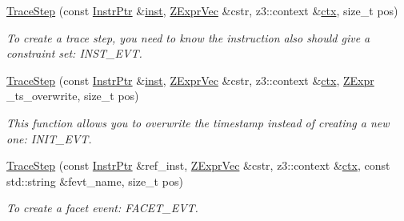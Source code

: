 \begin{DoxyCompactItemize}
\mbox{\hyperlink{classilang_1_1_trace_step_a66648351fc56eb04788815ee04621153}{Trace\+Step}} (const \mbox{\hyperlink{namespaceilang_af88a19312ae653d687a0d1207bb284f6}{Instr\+Ptr}} \&\mbox{\hyperlink{classilang_1_1_trace_step_ad46be2e7ab006f89051c91dd939ece7a}{inst}}, \mbox{\hyperlink{classilang_1_1_trace_step_a19a387426712dbec11dcecf170fb7e1a}{Z\+Expr\+Vec}} \&cstr, z3\+::context \&\mbox{\hyperlink{classilang_1_1_trace_step_afcab3e7a5ce7b619dd445882a9846c93}{ctx}}, size\+\_\+t pos)
\begin{DoxyCompactList}\small\item\em To create a trace step, you need to know the instruction also should give a constraint set\+: I\+N\+S\+T\+\_\+\+E\+VT. \end{DoxyCompactList}\item 
\mbox{\label{classilang_1_1_trace_step_a58487a85ca2aac2b322702bd1277d360}} 
\mbox{\hyperlink{classilang_1_1_trace_step_a58487a85ca2aac2b322702bd1277d360}{Trace\+Step}} (const \mbox{\hyperlink{namespaceilang_af88a19312ae653d687a0d1207bb284f6}{Instr\+Ptr}} \&\mbox{\hyperlink{classilang_1_1_trace_step_ad46be2e7ab006f89051c91dd939ece7a}{inst}}, \mbox{\hyperlink{classilang_1_1_trace_step_a19a387426712dbec11dcecf170fb7e1a}{Z\+Expr\+Vec}} \&cstr, z3\+::context \&\mbox{\hyperlink{classilang_1_1_trace_step_afcab3e7a5ce7b619dd445882a9846c93}{ctx}}, \mbox{\hyperlink{classilang_1_1_trace_step_a30c567f4df5a8481f8432b8c178a1794}{Z\+Expr}} \+\_\+ts\+\_\+overwrite, size\+\_\+t pos)
\begin{DoxyCompactList}\small\item\em This function allows you to overwrite the timestamp instead of creating a new one\+: I\+N\+I\+T\+\_\+\+E\+VT. \end{DoxyCompactList}\item 
\mbox{\label{classilang_1_1_trace_step_a00bb697aae1b0f55a0bb9623463a7c15}} 
\mbox{\hyperlink{classilang_1_1_trace_step_a00bb697aae1b0f55a0bb9623463a7c15}{Trace\+Step}} (const \mbox{\hyperlink{namespaceilang_af88a19312ae653d687a0d1207bb284f6}{Instr\+Ptr}} \&ref\+\_\+inst, \mbox{\hyperlink{classilang_1_1_trace_step_a19a387426712dbec11dcecf170fb7e1a}{Z\+Expr\+Vec}} \&cstr, z3\+::context \&\mbox{\hyperlink{classilang_1_1_trace_step_afcab3e7a5ce7b619dd445882a9846c93}{ctx}}, const std\+::string \&fevt\+\_\+name, size\+\_\+t pos)
\begin{DoxyCompactList}\small\item\em To create a facet event\+: F\+A\+C\+E\+T\+\_\+\+E\+VT. \end{DoxyCompactList}\item 

\end{DoxyCompactItemize}
